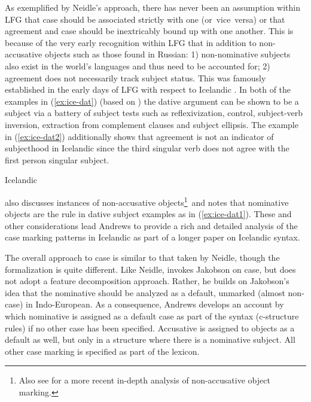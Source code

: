 \documentclass[output=paper,hidelinks]{langscibook}
\begin{document}
As exemplified by Neidle's approach, there has never been an assumption within
LFG that case should be associated
strictly with one \GF \mbox{(or vice versa)} or that agreement and case should be
inextricably bound up with one another.  This is because of the very early
recognition within LFG that in addition to non-accusative objects such as those
found in Russian: 1) non-nominative subjects also exist in the world's
languages and thus need to be accounted for;  2) agreement does not necessarily
track subject status. This was famously established in the early days of LFG
with respect to Icelandic \citep{Andrews76:VP,ZMT85:Case}. In both of the
examples   in (\ref{ex:ice-dat}) (based on  \citealt[462--463]{Andrews82}) the
dative argument can be shown to be a subject via a battery of subject tests such
as reflexivization, control, subject-verb inversion, extraction
from complement clauses and subject ellipsis.  The example in
(\ref{ex:ice-dat2}) additionally shows that agreement is not an indicator of
subjecthood in Icelandic since the third singular verb does not agree with the first person
singular subject.  
\begin{exe}
  \ex \label{ex:ice-dat} Icelandic 
 \begin{xlist}
\end{xlist}
\end{exe}
\citet{Andrews82} also discusses instances of non-accusative
objects\footnote{Also see \citet{Svenonius2002} for a more recent in-depth analysis
  of non-accusative object marking.}\ and notes that nominative objects are the
rule in dative subject examples as in (\ref{ex:ice-dat1}).  These and other
considerations lead Andrews to provide a rich and detailed analysis of the case marking
patterns in Icelandic as part of a longer paper on Icelandic syntax.

The overall approach to case is similar to that taken by Neid\-le, though the
formalization is quite different.  Like Neid\-le, \citet{Andrews82} invokes
Jakobson on case, but does not adopt a feature decomposition approach.  Rather,
he builds on Jakobson's idea that the nominative should be analyzed as a
default, unmarked (almost non-case) in Indo-European.  As a consequence, Andrews
develops an account by which nominative is assigned as a default case as part of
the syntax (c-structure rules) if no other case has been specified.  Accusative
is assigned to objects as a default as well, but only in a structure where there
is a nominative subject. All other case marking is specified as part of the
lexicon.
\end{document}
